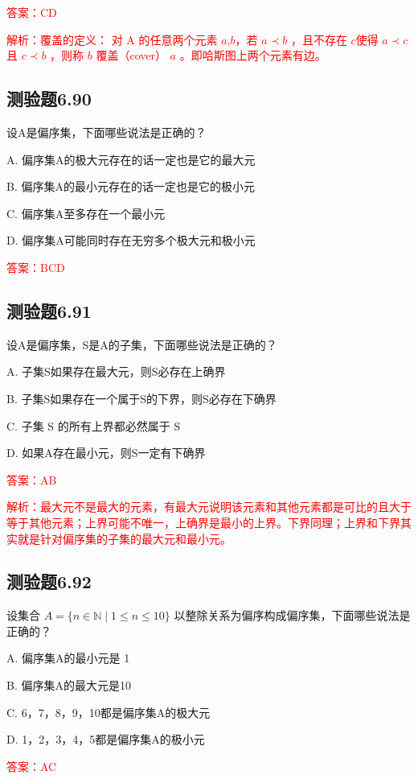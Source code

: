 \documentclass[UTF8, heading=true]{ctexart}
\begin{document}
\textcolor{red}{答案：CD}

\textcolor{red}{解析：覆盖的定义：
对 A 的任意两个元素 $a$,$ b $，若 $a \prec b$ ，且不存在 $c $使得 $a \prec c$ 且 $c \prec b$ ，则称 $b$ 覆盖（cover） $a$ 。即哈斯图上两个元素有边。}


\subsection{测验题6.90}

设A是偏序集，下面哪些说法是正确的？

A. 偏序集A的极大元存在的话一定也是它的最大元

B. 偏序集A的最小元存在的话一定也是它的极小元

C. 偏序集A至多存在一个最小元

D. 偏序集A可能同时存在无穷多个极大元和极小元

\textcolor{red}{答案：BCD}

\subsection{测验题6.91}

设A是偏序集，S是A的子集，下面哪些说法是正确的？

A. 子集S如果存在最大元，则S必存在上确界

B. 子集S如果存在一个属于S的下界，则S必存在下确界

C. 子集 S 的所有上界都必然属于 S

D. 如果A存在最小元，则S一定有下确界

\textcolor{red}{答案：AB}

\textcolor{red}{解析：最大元不是最大的元素，有最大元说明该元素和其他元素都是可比的且大于等于其他元素；上界可能不唯一，上确界是最小的上界。下界同理；上界和下界其实就是针对偏序集的子集的最大元和最小元。}

\subsection{测验题6.92}

设集合 $A=\{n \in \mathbb{N} \mid 1 \leq n \leq 10\}$ 以整除关系为偏序构成偏序集，下面哪些说法是正确的？

A. 偏序集A的最小元是 1

B. 偏序集A的最大元是10

C. 6，7，8，9，10都是偏序集A的极大元

D. 1，2，3，4，5都是偏序集A的极小元

\textcolor{red}{答案：AC}
\end{document}
